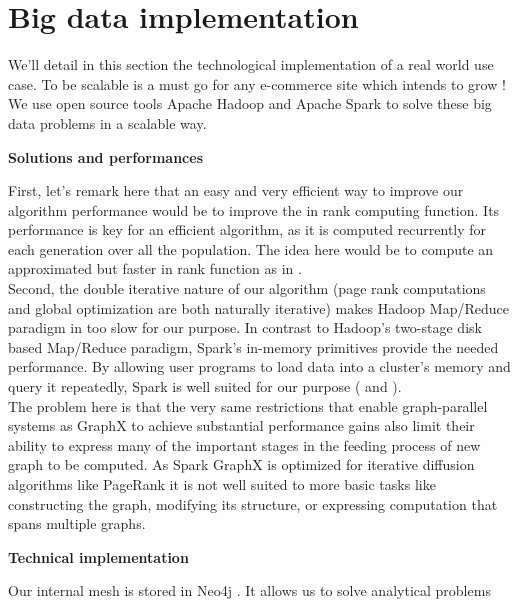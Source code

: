 \documentclass{iSWAGArticle}
\begin{document}
  \section{Big data implementation}
  We'll detail in this section the technological implementation of a real world use case.
  To be scalable is a must go for any e-commerce site which intends to grow !
  We use open source tools Apache Hadoop \cite{apache_hadoop} and Apache Spark \cite{spark} to solve these big data problems in a scalable way. 
  \begin{center}
  \textbf{\large Solutions and performances}
  \end{center}
  First, let's remark here that an easy and very efficient way to improve our algorithm performance would be to improve the in rank computing function. Its performance is key for an efficient algorithm, as it
  is computed recurrently for each generation over all the population. The idea here would be to compute an approximated but faster in rank function as in \cite{page_rank_approx}.
  \\\newline
  Second, the double iterative nature of our algorithm (page rank computations and global optimization are both naturally iterative)
  makes Hadoop Map/Reduce paradigm in \cite{map_reduce} too slow for our purpose. 
  In contrast to Hadoop's two-stage disk based Map/Reduce paradigm, Spark's in-memory primitives provide the needed performance.
  By allowing user programs to load data into a cluster's memory and query it repeatedly, Spark is well suited for our purpose (\cite{incremental_ram} and
  \cite{spark_methodo}).
  \\\newline
  The problem here is that the very same restrictions that enable graph-parallel systems as GraphX to achieve substantial performance gains also 
  limit their ability to express many of the important stages in the feeding process of new graph to be computed.
  As Spark GraphX is optimized for iterative diffusion algorithms like PageRank it is not well suited to more basic tasks like constructing the graph,
  modifying its structure, or expressing computation that spans multiple graphs.
  \\\newline
  \begin{center}
  \textbf{\large Technical implementation}
  \end{center}
  Our internal mesh is stored in Neo4j \cite{neo4j}. It allows us to solve analytical problems
\end{document}
